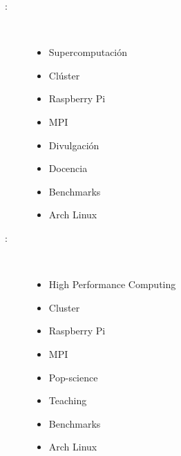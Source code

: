 \begin{multicols}{2}
\begin{description}
\item [\palabraschaveprincipal:] \mbox{} \\[-20pt]
  \begin{itemize}
    \item Supercomputación
    \item Clúster
    \item Raspberry Pi
    \item MPI
    \item Divulgación
    \item Docencia
    \item Benchmarks
    \item Arch Linux
  \end{itemize}
\end{description}
\begin{description}
\item [\palabraschavesecundaria:] \mbox{} \\[-20pt]
  \begin{itemize}
    \item High Performance Computing
    \item Cluster
    \item Raspberry Pi
    \item MPI
    \item Pop-science
    \item Teaching
    \item Benchmarks
    \item Arch Linux
  \end{itemize}
\end{description}
\end{multicols}
